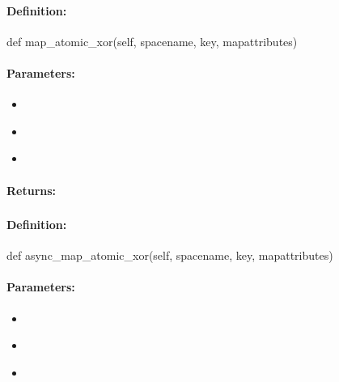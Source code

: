 \paragraph{Definition:}
\begin{pythoncode}
def map_atomic_xor(self, spacename, key, mapattributes)
\end{pythoncode}

\paragraph{Parameters:}
\begin{itemize}[noitemsep]
\item {}\\

\item {}\\

\item {}\\

\end{itemize}

\paragraph{Returns:}


\pagebreak
\subsubsection{}
\label{api:python:async_map_atomic_xor}


\paragraph{Definition:}
\begin{pythoncode}
def async_map_atomic_xor(self, spacename, key, mapattributes)
\end{pythoncode}

\paragraph{Parameters:}
\begin{itemize}[noitemsep]
\item {}\\

\item {}\\

\item {}\\

\end{itemize}

